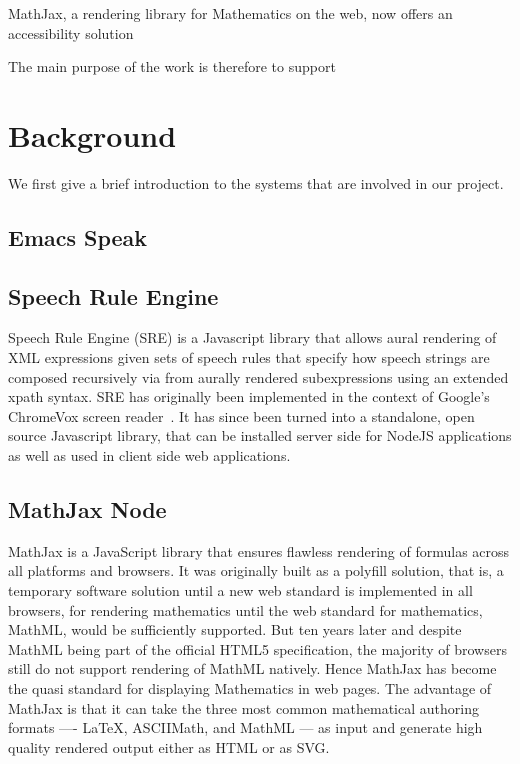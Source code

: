 \documentclass{sig-alternate}
\newcommand{\latex}{\LaTeX\xspace}
\newcommand{\sre}{SRE\xspace}
\def\latex{\LaTeX}
\begin{document}
MathJax, a rendering library for Mathematics on the web, now offers an
accessibility solution

The main purpose of the work is therefore to support 

\section{Background}
\label{sec:background}

We first give a brief introduction to the systems that are involved in our
project.

\subsection{Emacs Speak}
\label{sec:emacs-speak}

\subsection{Speech Rule Engine}
\label{sec:sre}

Speech Rule Engine (\sre) is a Javascript library that allows aural rendering of
XML expressions given sets of speech rules that specify how speech strings are
composed recursively via from aurally rendered subexpressions using an extended
xpath syntax.  \sre has originally been implemented in the context of Google's
ChromeVox screen reader~\cite{chromevox}. It has since been turned into a
standalone, open source Javascript library, that can be installed server side
for NodeJS applications as well as used in client side web applications.





\subsection{MathJax Node}
\label{sec:mathjax-node}

MathJax is a JavaScript library that ensures flawless rendering of formulas
across all platforms and browsers. It was originally built as a polyfill
solution, that is, a temporary software solution until a new web standard is
implemented in all browsers, for rendering mathematics until the web standard
for mathematics, MathML, would be sufficiently supported.  But ten years later
and despite MathML being part of the official HTML5 specification, the majority
of browsers still do not support rendering of MathML natively. Hence MathJax has
become the quasi standard for displaying Mathematics in web pages.
The advantage of MathJax is that it can take the three most common mathematical
authoring formats ---- {\latex}, ASCIIMath\cite{asciimath}, and MathML --- as
input and generate high quality rendered output either as HTML or as SVG.
\end{document}
